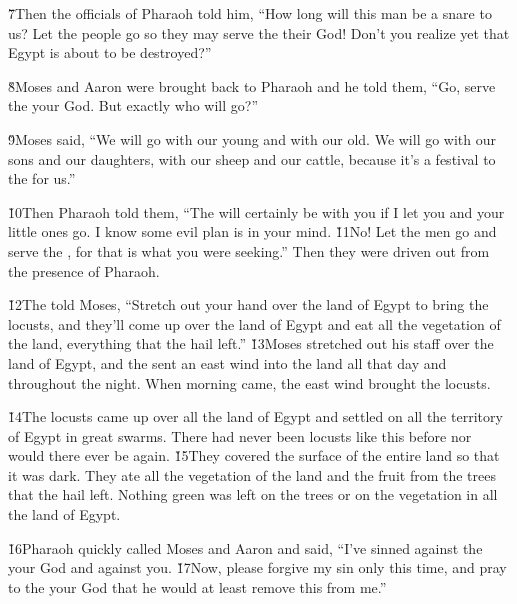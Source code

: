 \v{7}Then the officials of Pharaoh told him, ``How long will this man be a snare to us? Let the people go so they may serve the  their God! Don't you realize yet that Egypt is about to be destroyed?''

\v{8}Moses and Aaron were brought back to Pharaoh and he told them, ``Go, serve the  your God. But exactly who will go?''

\v{9}Moses said, ``We will go with our young and with our old. We will go with our sons and our daughters, with our sheep and our cattle, because it's a festival to the  for us.''

\v{10}Then Pharaoh told them, ``The  will certainly be with you if I let you and your little ones go. I know some evil plan is in your mind. \v{11}No! Let the men go and serve the , for that is what you were seeking.'' Then they were driven out from the presence of Pharaoh.

\v{12}The  told Moses, ``Stretch out your hand over the land of Egypt to bring the locusts, and they'll come up over the land of Egypt and eat all the vegetation of the land, everything that the hail left.'' \v{13}Moses stretched out his staff over the land of Egypt, and the  sent an east wind into the land all that day and throughout the night. When morning came, the east wind brought the locusts.

\v{14}The locusts came up over all the land of Egypt and settled on all the territory of Egypt in great swarms. There had never been locusts like this before nor would there ever be again. \v{15}They covered the surface of the entire land so that it was dark. They ate all the vegetation of the land and the fruit from the trees that the hail left. Nothing green was left on the trees or on the vegetation in all the land of Egypt.

\v{16}Pharaoh quickly called Moses and Aaron and said, ``I've sinned against the  your God and against you. \v{17}Now, please forgive my sin only this time, and pray to the  your God that he would at least remove this from me.''


